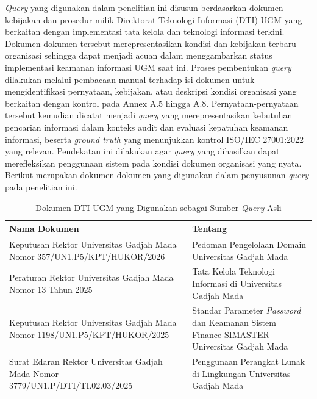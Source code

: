 \textit{Query} yang digunakan dalam penelitian ini disusun berdasarkan dokumen kebijakan dan prosedur milik Direktorat Teknologi Informasi (DTI) UGM yang berkaitan dengan implementasi tata kelola dan teknologi informasi terkini. Dokumen-dokumen tersebut merepresentasikan kondisi dan kebijakan terbaru organisasi sehingga dapat menjadi acuan dalam menggambarkan status implementasi keamanan informasi UGM saat ini. Proses pembentukan \textit{query} dilakukan melalui pembacaan manual terhadap isi dokumen untuk mengidentifikasi pernyataan, kebijakan, atau deskripsi kondisi organisasi yang berkaitan dengan kontrol pada Annex A.5 hingga A.8. Pernyataan-pernyataan tersebut kemudian dicatat menjadi \textit{query} yang merepresentasikan kebutuhan pencarian informasi dalam konteks audit dan evaluasi kepatuhan keamanan informasi, beserta \textit{ground truth} yang menunjukkan kontrol ISO/IEC 27001:2022 yang relevan. Pendekatan ini dilakukan agar \textit{query} yang dihasilkan dapat merefleksikan penggunaan sistem pada kondisi dokumen organisasi yang nyata. Berikut merupakan dokumen-dokumen yang digunakan dalam penyusunan \textit{query} pada penelitian ini.

\begin{table}[H]
\centering
\caption{Dokumen DTI UGM yang Digunakan sebagai Sumber \textit{Query} Asli}
\label{tab:dti_dokumen}
\begin{tabular}{|>{\raggedright\arraybackslash}p{7.5cm}|>{\raggedright\arraybackslash}p{5.5cm}|}
\hline
\textbf{Nama Dokumen} & \textbf{Tentang} \\
\hline
Keputusan Rektor Universitas Gadjah Mada Nomor 357/UN1.P5/KPT/HUKOR/2026 &
Pedoman Pengelolaan Domain Universitas Gadjah Mada \\
\hline
Peraturan Rektor Universitas Gadjah Mada Nomor 13 Tahun 2025 &
Tata Kelola Teknologi Informasi di Universitas Gadjah Mada \\
\hline
Keputusan Rektor Universitas Gadjah Mada Nomor 1198/UN1.P5/KPT/HUKOR/2025 &
Standar Parameter \textit{Password} dan Keamanan Sistem Finance SIMASTER Universitas Gadjah Mada \\
\hline
Surat Edaran Rektor Universitas Gadjah Mada Nomor 3779/UN1.P/DTI/TI.02.03/2025 &
Penggunaan Perangkat Lunak di Lingkungan Universitas Gadjah Mada \\
\hline
\end{tabular}
\end{table}

